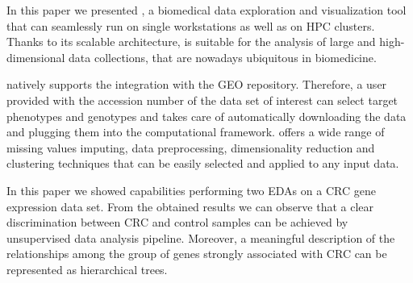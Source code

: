 
In this paper we presented \ade, a biomedical data exploration and visualization tool that can seamlessly run on single workstations as well as on HPC clusters.
Thanks to its scalable architecture, \ade is suitable for the analysis of large and high-dimensional data collections, that are nowadays ubiquitous in biomedicine.

\ade natively supports the integration with the GEO repository. Therefore, a user provided with the accession number of the data set of interest can select target phenotypes and genotypes and \ade takes care of automatically downloading the data and plugging them into the computational framework.
\ade offers a wide range of missing values imputing, data preprocessing, dimensionality reduction and clustering techniques that can be easily selected and applied to any input data.

In this paper we showed \ade capabilities performing two EDAs on a CRC gene expression data set. From the obtained results we can observe that a clear discrimination between CRC and control samples can be achieved by unsupervised data analysis pipeline.
Moreover, a meaningful description of the relationships among the group of genes strongly associated with CRC can be represented as hierarchical trees.
